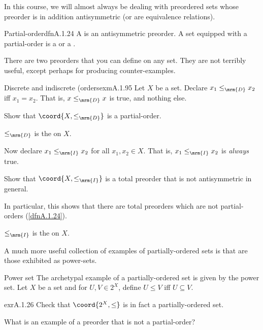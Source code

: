 In this course, we will almost always be dealing with preordered sets whose preorder is in addition antisymmetric (or are equivalence relations).
\begin{dfn}{Partial-order}{dfnA.1.24}
A  is an antisymmetric preorder.  A set equipped with a partial-order is a  or a .
\end{dfn}
There are two preorders that you can define on any set.  They are not terribly useful, except perhaps for producing counter-examples.
\begin{exm}{Discrete and indiscrete (orders}{exmA.1.95}
	Let $X$ be a set.  Declare $x_1\leq _{\mrm{D}}x_2$ iff $x_1=x_2$.  That is, $x\leq _{\mrm{D}}x$ is true, and nothing else.
	\begin{exr}[breakable=false]{}{}
		Show that $\coord{X,\leq _{\mrm{D}}}$ is a partial-order.
		\begin{rmk}
			$\leq _{\mrm{D}}$ is the  on $X$.
		\end{rmk}
	\end{exr}
	
	Now declare $x_1\leq _{\mrm{I}}x_2$ for all $x_1,x_2\in X$.  That is, $x_1\leq _{\mrm{I}}x_2$ is \emph{always} true.
	\begin{exr}[breakable=false]{}{}
		Show that $\coord{X,\leq _{\mrm{I}}}$ is a total preorder that is not antisymmetric in general.
		\begin{rmk}
			In particular, this shows that there are total preorders which are not partial-orders (\cref{dfnA.1.24}).
		\end{rmk}
		\begin{rmk}
			$\leq _{\mrm{I}}$ is the  on $X$.
		\end{rmk}
	\end{exr}
\end{exm}
A much more useful collection of examples of partially-ordered sets is that are those exhibited as power-sets.
\begin{exm}{Power set}{}
The archetypal example of a partially-ordered set is given by the power set.  Let $X$ be a set and for $U,V\in 2^X$, define $U\leq V$ iff $U\subseteq V$.
\begin{exr}{}{exrA.1.26}
Check that $\coord{2^X,\leq}$ is in fact a partially-ordered set.
\end{exr}
\end{exm}
\begin{exr}{}{}
What is an example of a preorder that is not a partial-order?
\end{exr}

